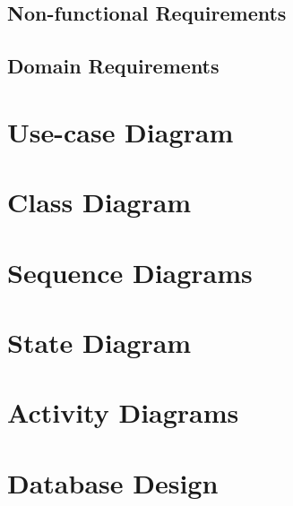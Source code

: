 \documentclass[12pt]{article}
\begin{document}
\subsection{Non-functional Requirements}

\subsection{Domain Requirements}

\section{Use-case Diagram}

\section{Class Diagram}

\section{Sequence Diagrams}

\section{State Diagram}

\section{Activity Diagrams}

\section{Database Design}
\end{document}
